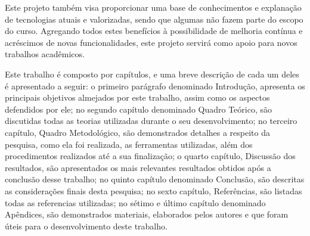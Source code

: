 \par Este projeto também visa proporcionar uma base de conhecimentos e explanação de tecnologias atuais e valorizadas, sendo que algumas não fazem parte do escopo do curso. Agregando todos estes benefícios à possibilidade de melhoria contínua e acréscimos de novas funcionalidades, este projeto servirá como apoio para novos trabalhos acadêmicos.

\par Este trabalho é composto por capítulos, e uma breve descrição de cada um deles é apresentado a seguir: o primeiro parágrafo denominado Introdução, apresenta os principais objetivos almejados por este trabalho, assim como os aspectos defendidos por ele; no segundo capítulo denominado Quadro Teórico, são discutidas todas as teorias utilizadas durante o seu desenvolvimento; no terceiro capítulo, Quadro Metodológico, são demonstrados detalhes a respeito da pesquisa, como ela foi realizada, as ferramentas utilizadas, além dos procedimentos realizados até a sua finalização; o quarto capítulo, Discussão dos resultados, são apresentados os mais relevantes resultados obtidos após a conclusão desse trabalho; no quinto capítulo denominado Conclusão, são descritas as considerações finais desta pesquisa; no sexto capítulo, Referências, são listadas todas as referencias utilizadas; no sétimo e último capítulo denominado Apêndices, são demonstrados materiais, elaborados pelos autores e que foram úteis para o desenvolvimento deste trabalho.
